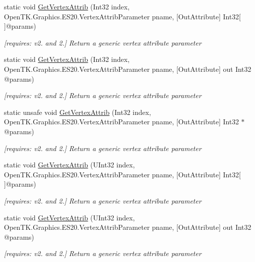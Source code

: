 \begin{DoxyCompactItemize}
static void \hyperlink{class_open_t_k_1_1_graphics_1_1_e_s20_1_1_g_l_ac22783b5e0032fd97b8c7120b679a692}{Get\-Vertex\-Attrib} (Int32 index, Open\-T\-K.\-Graphics.\-E\-S20.\-Vertex\-Attrib\-Parameter pname, \mbox{[}Out\-Attribute\mbox{]} Int32\mbox{[}$\,$\mbox{]}@params)
\begin{DoxyCompactList}\small\item\em \mbox{[}requires\-: v2. and 2.\mbox{]} Return a generic vertex attribute parameter \end{DoxyCompactList}\item 
static void \hyperlink{class_open_t_k_1_1_graphics_1_1_e_s20_1_1_g_l_ab91a10ed659ffebf4ae17d268d27e646}{Get\-Vertex\-Attrib} (Int32 index, Open\-T\-K.\-Graphics.\-E\-S20.\-Vertex\-Attrib\-Parameter pname, \mbox{[}Out\-Attribute\mbox{]} out Int32 @params)
\begin{DoxyCompactList}\small\item\em \mbox{[}requires\-: v2. and 2.\mbox{]} Return a generic vertex attribute parameter \end{DoxyCompactList}\item 
static unsafe void \hyperlink{class_open_t_k_1_1_graphics_1_1_e_s20_1_1_g_l_a2b1315b3f7334c6043e6f248e6977e81}{Get\-Vertex\-Attrib} (Int32 index, Open\-T\-K.\-Graphics.\-E\-S20.\-Vertex\-Attrib\-Parameter pname, \mbox{[}Out\-Attribute\mbox{]} Int32 $\ast$@params)
\begin{DoxyCompactList}\small\item\em \mbox{[}requires\-: v2. and 2.\mbox{]} Return a generic vertex attribute parameter \end{DoxyCompactList}\item 
static void \hyperlink{class_open_t_k_1_1_graphics_1_1_e_s20_1_1_g_l_aa51b34ee4f7980cab16f0cf2cf2c8ace}{Get\-Vertex\-Attrib} (U\-Int32 index, Open\-T\-K.\-Graphics.\-E\-S20.\-Vertex\-Attrib\-Parameter pname, \mbox{[}Out\-Attribute\mbox{]} Int32\mbox{[}$\,$\mbox{]}@params)
\begin{DoxyCompactList}\small\item\em \mbox{[}requires\-: v2. and 2.\mbox{]} Return a generic vertex attribute parameter \end{DoxyCompactList}\item 
static void \hyperlink{class_open_t_k_1_1_graphics_1_1_e_s20_1_1_g_l_a16747e4b67ae432397d60192ec9048c8}{Get\-Vertex\-Attrib} (U\-Int32 index, Open\-T\-K.\-Graphics.\-E\-S20.\-Vertex\-Attrib\-Parameter pname, \mbox{[}Out\-Attribute\mbox{]} out Int32 @params)
\begin{DoxyCompactList}\small\item\em \mbox{[}requires\-: v2. and 2.\mbox{]} Return a generic vertex attribute parameter \end{DoxyCompactList}\item 

\end{DoxyCompactItemize}
